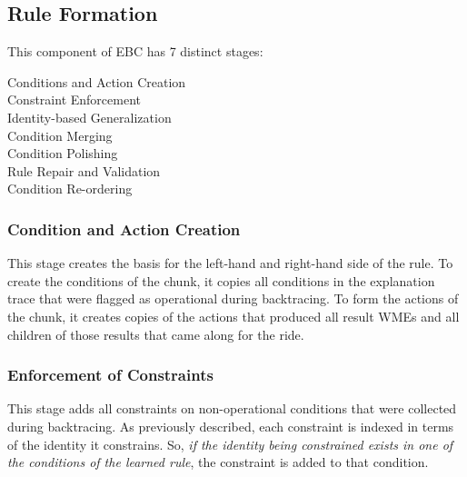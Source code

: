 \subsection{Rule Formation}
\label{CHUNKING-during-formation}

This component of EBC has 7 distinct stages:

\begin{description}
	\item [Conditions and Action Creation]
	\vspace{-6pt}
	\item [Constraint Enforcement]
	\vspace{-6pt}
	\item [Identity-based Generalization]
	\vspace{-6pt}
	\item [Condition Merging]
	\vspace{-6pt}
	\item [Condition Polishing]
	\vspace{-6pt}
	\item [Rule Repair and Validation]
	\vspace{-6pt}
	\item [Condition Re-ordering]
	\vspace{-6pt}
\end{description}

\subsubsection{Condition and Action Creation}

This stage creates the basis for the left-hand and right-hand side of the rule.  To create the conditions of the chunk, it copies all conditions in the explanation trace that were flagged as operational during backtracing.  To form the actions of the chunk, it creates copies of the actions that produced all result WMEs and all children of those results that came along for the ride.

\subsubsection{Enforcement of Constraints}

This stage adds all constraints on non-operational conditions that were collected during backtracing.  As previously described, each constraint is indexed in terms of the identity it constrains.  So, \textit{if the identity being constrained exists in one of the conditions of the learned rule}, the constraint is added to that condition.

